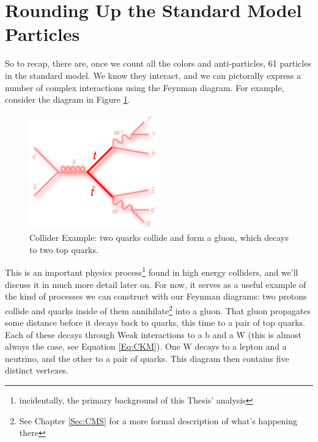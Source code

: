 \section{Rounding Up the Standard Model Particles}
So to recap, there are, once we count all the colors and anti-particles, 61 particles in the standard model. We know they interact, and we can pictorally express a number of complex interactions using the Feynman diagram. For example, consider the diagram in Figure \ref{Fig:Intro:ttbar}.
\begin{figure}[h]
    \centering
        \includegraphics[width=0.5\textwidth]{F1/ttbarIntroDiag}
        \caption{Collider Example: two quarks collide and form a gluon, which decays to two top quarks.}
        \label{Fig:Intro:ttbar}
\end{figure}
This is an important physics process\footnote{incidentally, the primary background of this Thesis' analysis} found in high energy colliders, and we'll discuss it in much more detail later on. For now, it serves as a useful example of the kind of processes we can construct with our Feynman diagrams: two protons collide and quarks inside of them annihilate\footnote{See Chapter \ref{Sec:CMS} for a more formal description of what's happening there} into a gluon. That gluon propagates some distance before it decays back to quarks, this time to a pair of top quarks. Each of these decays through Weak interactions to a b and a W (this is almost always the case, see Equation \ref{Eq:CKM}). One W decays to a lepton and a neutrino, and the other to a pair of quarks. This diagram then contains five distinct vertexes.

